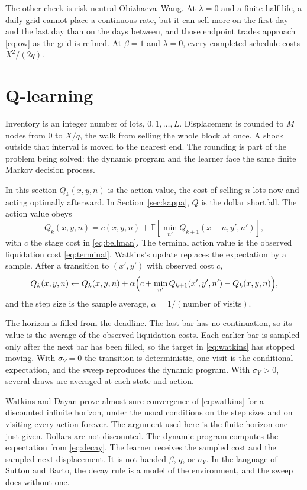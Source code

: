 \documentclass[11pt]{article}
\begin{document}
The other check is risk-neutral Obizhaeva--Wang. At \(\lambda = 0\) and a finite half-life, a daily grid cannot place a continuous rate, but it can sell more on the first day and the last day than on the days between, and those endpoint trades approach \eqref{eq:ow} as the grid is refined. At \(\beta = 1\) and \(\lambda = 0\), every completed schedule costs \(X^{2}/(2q)\).

\section{Q-learning}
\label{sec:q}

Inventory is an integer number of lots, \(0,1,\ldots,L\). Displacement is rounded to \(M\) nodes from \(0\) to \(X/q\), the walk from selling the whole block at once. A shock outside that interval is moved to the nearest end. The rounding is part of the problem being solved: the dynamic program and the learner face the same finite Markov decision process.

In this section \(Q_k(x,y,n)\) is the action value, the cost of selling \(n\) lots now and acting optimally afterward. In Section~\ref{sec:kappa}, \(Q\) is the dollar shortfall. The action value obeys
\begin{equation}
\label{eq:qstar}
Q_k(x,y,n)
  = c(x,y,n) + \mathbb{E}\!\left[\min_{n'}Q_{k+1}(x-n, y', n')\right],
\end{equation}
with \(c\) the stage cost in \eqref{eq:bellman}. The terminal action value is the observed liquidation cost \eqref{eq:terminal}. Watkins's update replaces the expectation by a sample. After a transition to \((x',y')\) with observed cost \(c\),
\begin{equation}
\label{eq:watkins}
Q_k(x,y,n)
  \leftarrow
  Q_k(x,y,n)
  + \alpha\Bigl(c + \min_{n'}Q_{k+1}(x',y',n') - Q_k(x,y,n)\Bigr),
\end{equation}
and the step size is the sample average, \(\alpha = 1/(\text{number of visits})\).

The horizon is filled from the deadline. The last bar has no continuation, so its value is the average of the observed liquidation costs. Each earlier bar is sampled only after the next bar has been filled, so the target in \eqref{eq:watkins} has stopped moving. With \(\sigma_Y = 0\) the transition is deterministic, one visit is the conditional expectation, and the sweep reproduces the dynamic program. With \(\sigma_Y > 0\), several draws are averaged at each state and action.

Watkins and Dayan prove almost-sure convergence of \eqref{eq:watkins} for a discounted infinite horizon, under the usual conditions on the step sizes and on visiting every action forever. The argument used here is the finite-horizon one just given. Dollars are not discounted. The dynamic program computes the expectation from \eqref{eq:decay}. The learner receives the sampled cost and the sampled next displacement. It is not handed \(\beta\), \(q\), or \(\sigma_Y\). In the language of Sutton and Barto, the decay rule is a model of the environment, and the sweep does without one.
\end{document}
